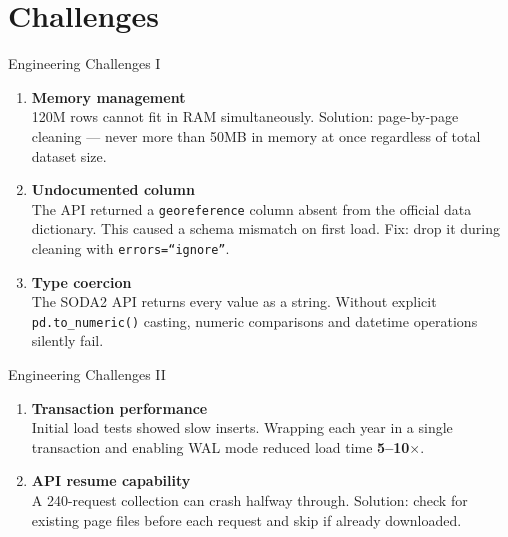 \documentclass{beamer}
\begin{document}
	\section{Challenges}
	
	\begin{frame}{Engineering Challenges I}
		\begin{enumerate}
			\item \textcolor{accentBlue}{\textbf{Memory management}}\\
			\small 120M rows cannot fit in RAM simultaneously.
			Solution: page-by-page cleaning — never more than 50MB in memory
			at once regardless of total dataset size.\\[0.3cm]
			
			\item \textcolor{mtaRed}{\textbf{Undocumented column}}\\
			\small The API returned a \texttt{georeference} column absent from
			the official data dictionary. This caused a schema mismatch on
			first load. Fix: drop it during cleaning with
			\texttt{errors=``ignore''}.\\[0.3cm]
			
			\item \textcolor{mtaGreen}{\textbf{Type coercion}}\\
			\small The SODA2 API returns every value as a string.
			Without explicit \texttt{pd.to\_numeric()} casting,
			numeric comparisons and datetime operations silently fail.\\[0.3cm]
			
		\end{enumerate}
	\end{frame}
	
		\begin{frame}{Engineering Challenges II}
		\begin{enumerate}
			
			
			\item[\textbf{4.}] \textcolor{mtaYellow}{\textbf{Transaction performance}}\\
			\small Initial load tests showed slow inserts.
			Wrapping each year in a single transaction and enabling
			WAL mode reduced load time \textbf{5--10$\times$}.\\[0.3cm]
			
			\item[\textbf{5.}] \textcolor{mtaOrange}{\textbf{API resume capability}}\\
			\small A 240-request collection can crash halfway through.
			Solution: check for existing page files before each request
			and skip if already downloaded.
		\end{enumerate}
	\end{frame}
	
\end{document}
